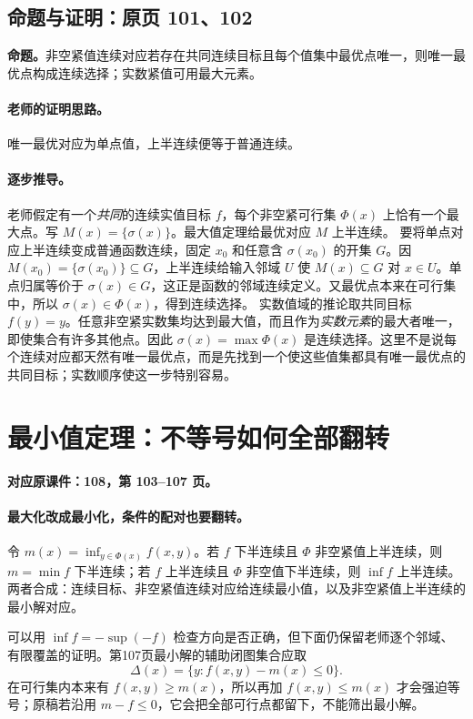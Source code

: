 \subsection{命题与证明：原页 101、102}

\textbf{命题。}非空紧值连续对应若存在共同连续目标且每个值集中最优点唯一，则唯一最优点构成连续选择；实数紧值可用最大元素。

\paragraph{老师的证明思路。}唯一最优对应为单点值，上半连续便等于普通连续。

\paragraph{逐步推导。}
老师假定有一个\emph{共同}的连续实值目标 $f$，每个非空紧可行集 $\Phi(x)$ 上恰有一个最大点。写 $M(x)=\{\sigma(x)\}$。最大值定理给最优对应 $M$ 上半连续。
要将单点对应上半连续变成普通函数连续，固定 $x_0$ 和任意含 $\sigma(x_0)$ 的开集 $G$。因 $M(x_0)=\{\sigma(x_0)\}\subseteq G$，上半连续给输入邻域 $U$ 使 $M(x)\subseteq G$ 对 $x\in U$。单点归属等价于 $\sigma(x)\in G$，这正是函数的邻域连续定义。又最优点本来在可行集中，所以 $\sigma(x)\in\Phi(x)$，得到连续选择。
实数值域的推论取共同目标 $f(y)=y$。任意非空紧实数集均达到最大值，而且作为\emph{实数元素}的最大者唯一，即使集合有许多其他点。因此 $\sigma(x)=\max\Phi(x)$ 是连续选择。这里不是说每个连续对应都天然有唯一最优点，而是先找到一个使这些值集都具有唯一最优点的共同目标；实数顺序使这一步特别容易。


\clearpage\section{最小值定理：不等号如何全部翻转}\label{g:108:103}

\textbf{对应原课件：108，第 103--107 页。}


\paragraph{最大化改成最小化，条件的配对也要翻转。}
令 $m(x)=\inf_{y\in\Phi(x)}f(x,y)$。若 $f$ 下半连续且 $\Phi$ 非空紧值上半连续，则 $m=\min f$ 下半连续；若 $f$ 上半连续且 $\Phi$ 非空值下半连续，则 $\inf f$ 上半连续。两者合成：连续目标、非空紧值连续对应给连续最小值，以及非空紧值上半连续的最小解对应。

可以用 $\inf f=-\sup(-f)$ 检查方向是否正确，但下面仍保留老师逐个邻域、有限覆盖的证明。第107页最小解的辅助闭图集合应取
\[\Delta(x)=\{y:f(x,y)-m(x)\le0\}.
\]
在可行集内本来有 $f(x,y)\ge m(x)$，所以再加 $f(x,y)\le m(x)$ 才会强迫等号；原稿若沿用 $m-f\le0$，它会把全部可行点都留下，不能筛出最小解。


